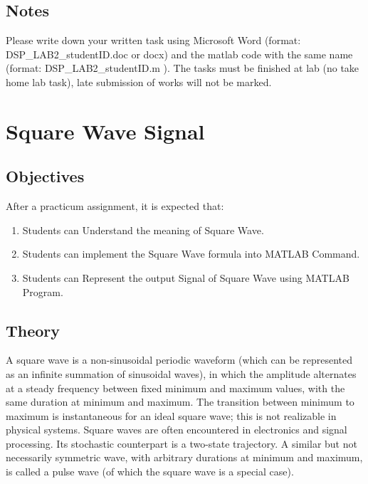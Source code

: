 \documentclass[]{report}
\begin{document}
\section{Notes}
	\par 
	Please write down your written task using Microsoft Word (format: DSP\_LAB2\_studentID.doc or docx) and the matlab code with the same name (format: DSP\_LAB2\_studentID.m ). The tasks must be finished at lab (no take home lab task), late submission of works will not be marked.
	     


\chapter{Square Wave Signal}
\section{Objectives}
	\par After a practicum assignment, it is expected that:	
	\begin{enumerate}
		\item Students can Understand the meaning of Square Wave.
		\item Students can implement the Square Wave formula into MATLAB Command.
		\item Students can Represent the output Signal of Square Wave using MATLAB Program.
	\end{enumerate}

\section{Theory}
	\par 
	A square wave is a non-sinusoidal periodic waveform (which can be represented as an infinite summation of sinusoidal waves), in which the amplitude alternates at a steady frequency between fixed minimum and maximum values, with the same duration at minimum and maximum. The transition between minimum to maximum is instantaneous for an ideal square wave; this is not realizable in physical systems. Square waves are often encountered in electronics and signal processing. Its stochastic counterpart is a two-state trajectory. A similar but not necessarily symmetric wave, with arbitrary durations at minimum and maximum, is called a pulse wave (of which the square wave is a special case).
	
\end{document}

